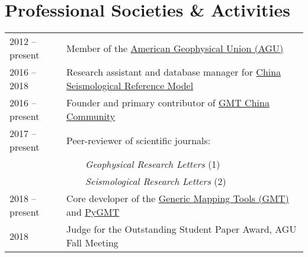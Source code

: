 \section*{Professional Societies \& Activities}

\newcommand{\tabitem}{~~\llap{\textbullet}~~}

\begin{tabular}{ll}
2012 -- present & Member of the \href{https://sites.agu.org/}{American Geophysical Union (AGU)} \\
2016 -- 2018    & Research assistant and database manager for \href{http://chinageorefmodel.org/}{China Seismological Reference Model} \\
2016 -- present & Founder and primary contributor of \href{http://gmt-china.org/}{GMT China Community} \\
2017 -- present & Peer-reviewer of scientific journals: \\
                & \tabitem \textit{Geophysical Research Letters} (1) \\
                & \tabitem \textit{Seismological Research Letters} (2) \\
2018 -- present & Core developer of the \href{https://github.com/GenericMappingTools/gmt}{Generic Mapping Tools (GMT)} and \href{https://github.com/GenericMappingTools/pygmt}{PyGMT} \\
2018 & Judge for the Outstanding Student Paper Award, AGU Fall Meeting
\end{tabular}
